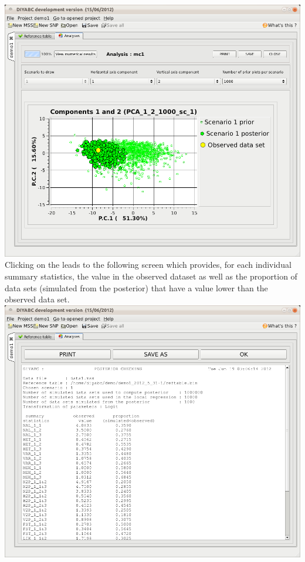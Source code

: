 \includegraphics[scale=0.33]{gui_pictures/Capture-DIYABC-58.png} \\

Clicking on the  leads to the following screen which provides, for each individual summary statistics, the value in the observed dataset as well as the proportion of data sets (simulated from the posterior) that have a value lower than the observed data set.\\
 
\includegraphics[scale=0.33]{gui_pictures/Capture-DIYABC-60.png} \\


